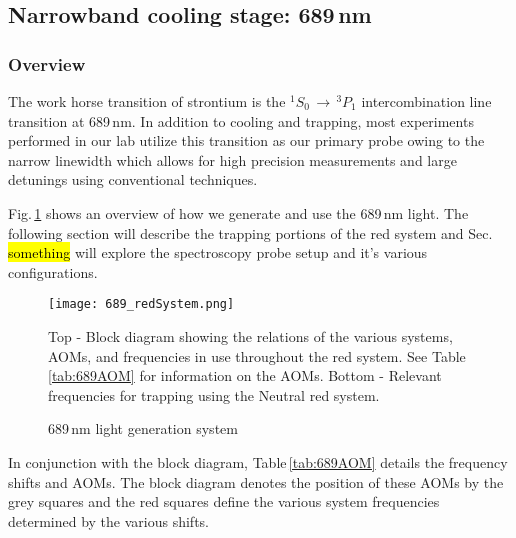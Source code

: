 \pagebreak
\subsection{Narrowband cooling stage: 689\,nm} \label{ssec:689sys}
\subsubsection{Overview}
The work horse transition of strontium is the $^1S_0\,\rightarrow\,^3P_1$ intercombination line transition at 689\,nm. 
In addition to cooling and trapping, most experiments performed in our lab utilize this transition as our primary probe owing to the narrow linewidth which allows for high precision measurements and large detunings using conventional techniques.

Fig.\,\ref{fig:689blockSys} shows an overview of how we generate and use the 689\,nm light. 
The following section will describe the trapping portions of the red system and Sec.\,\hl{something} will explore the spectroscopy probe setup and it's various configurations.
	\begin{figure}
		\centerline{
		\texttt{[image: 689\_redSystem.png]}}
		\caption{689\,nm light generation system}{Top - Block diagram showing the relations of the various systems, AOMs, and frequencies in use throughout the red system. See Table \ref{tab:689AOM} for information on the AOMs. Bottom - Relevant frequencies for trapping using the Neutral red system.}
		\label{fig:689blockSys}
	\end{figure} 
In conjunction with the block diagram, Table\,\ref{tab:689AOM} details the frequency shifts and AOMs. 
The block diagram denotes the position of these AOMs by the grey squares and the red squares define the various system frequencies determined by the various shifts.
